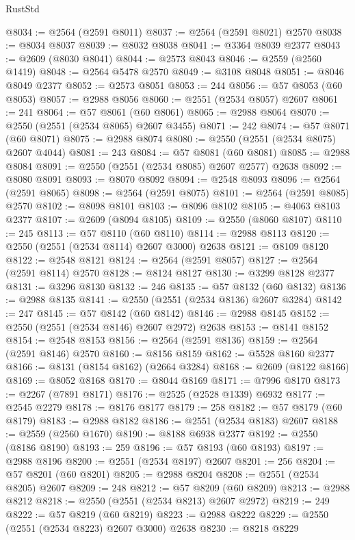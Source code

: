 \begin{lexlean}{RustStd}
\begin{coremodule}
@8034 := @2564 (@2591 @8011)
@8037 := @2564 (@2591 @8021) @2570
@8038 := @8034 @8037
@8039 := @8032 @8038
@8041 := @3364 @8039 @2377
@8043 := @2609 (@8030 @8041)
@8044 := @2573 @8043
@8046 := @2559 (@2560 @1419)
@8048 := @2564 @5478 @2570
@8049 := @3108 @8048
@8051 := @8046 @8049 @2377
@8052 := @2573 @8051
@8053 := 244
@8056 := @57 @8053 (@60 @8053)
@8057 := @2988 @8056
@8060 := @2551 (@2534 @8057) @2607
@8061 := 241
@8064 := @57 @8061 (@60 @8061)
@8065 := @2988 @8064
@8070 := @2550 (@2551 (@2534 @8065) @2607 @3455)
@8071 := 242
@8074 := @57 @8071 (@60 @8071)
@8075 := @2988 @8074
@8080 := @2550 (@2551 (@2534 @8075) @2607 @4044)
@8081 := 243
@8084 := @57 @8081 (@60 @8081)
@8085 := @2988 @8084
@8091 := @2550 (@2551 (@2534 @8085) @2607 @2577) @2638
@8092 := @8080 @8091
@8093 := @8070 @8092
@8094 := @2548 @8093
@8096 := @2564 (@2591 @8065)
@8098 := @2564 (@2591 @8075)
@8101 := @2564 (@2591 @8085) @2570
@8102 := @8098 @8101
@8103 := @8096 @8102
@8105 := @4063 @8103 @2377
@8107 := @2609 (@8094 @8105)
@8109 := @2550 (@8060 @8107)
@8110 := 245
@8113 := @57 @8110 (@60 @8110)
@8114 := @2988 @8113
@8120 := @2550 (@2551 (@2534 @8114) @2607 @3000) @2638
@8121 := @8109 @8120
@8122 := @2548 @8121
@8124 := @2564 (@2591 @8057)
@8127 := @2564 (@2591 @8114) @2570
@8128 := @8124 @8127
@8130 := @3299 @8128 @2377
@8131 := @3296 @8130
@8132 := 246
@8135 := @57 @8132 (@60 @8132)
@8136 := @2988 @8135
@8141 := @2550 (@2551 (@2534 @8136) @2607 @3284)
@8142 := 247
@8145 := @57 @8142 (@60 @8142)
@8146 := @2988 @8145
@8152 := @2550 (@2551 (@2534 @8146) @2607 @2972) @2638
@8153 := @8141 @8152
@8154 := @2548 @8153
@8156 := @2564 (@2591 @8136)
@8159 := @2564 (@2591 @8146) @2570
@8160 := @8156 @8159
@8162 := @5528 @8160 @2377
@8166 := @8131 (@8154 @8162) (@2664 @3284)
@8168 := @2609 (@8122 @8166)
@8169 := @8052 @8168
@8170 := @8044 @8169
@8171 := @7996 @8170
@8173 := @2267 (@7891 @8171)
@8176 := @2525 (@2528 @1339) @6932
@8177 := @2545 @2279
@8178 := @8176 @8177
@8179 := 258
@8182 := @57 @8179 (@60 @8179)
@8183 := @2988 @8182
@8186 := @2551 (@2534 @8183) @2607
@8188 := @2559 (@2560 @1670)
@8190 := @8188 @6938 @2377
@8192 := @2550 (@8186 @8190)
@8193 := 259
@8196 := @57 @8193 (@60 @8193)
@8197 := @2988 @8196
@8200 := @2551 (@2534 @8197) @2607
@8201 := 256
@8204 := @57 @8201 (@60 @8201)
@8205 := @2988 @8204
@8208 := @2551 (@2534 @8205) @2607
@8209 := 248
@8212 := @57 @8209 (@60 @8209)
@8213 := @2988 @8212
@8218 := @2550 (@2551 (@2534 @8213) @2607 @2972)
@8219 := 249
@8222 := @57 @8219 (@60 @8219)
@8223 := @2988 @8222
@8229 := @2550 (@2551 (@2534 @8223) @2607 @3000) @2638
@8230 := @8218 @8229

\end{coremodule}
\end{lexlean}
